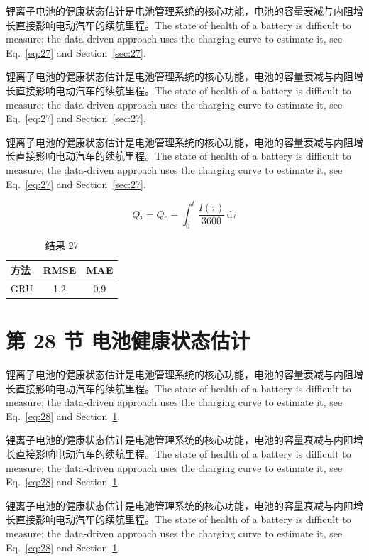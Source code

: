 \documentclass[UTF8,fontset=mac]{ctexart}
\begin{document}
锂离子电池的健康状态估计是电池管理系统的核心功能，电池的容量衰减与内阻增长直接影响电动汽车的续航里程\cite{a2020}。The state of health of a battery is difficult to measure; the data-driven approach uses the charging curve to estimate it, see Eq.~\eqref{eq:27} and Section~\ref{sec:27}.

锂离子电池的健康状态估计是电池管理系统的核心功能，电池的容量衰减与内阻增长直接影响电动汽车的续航里程\cite{a2020}。The state of health of a battery is difficult to measure; the data-driven approach uses the charging curve to estimate it, see Eq.~\eqref{eq:27} and Section~\ref{sec:27}.

锂离子电池的健康状态估计是电池管理系统的核心功能，电池的容量衰减与内阻增长直接影响电动汽车的续航里程\cite{a2020}。The state of health of a battery is difficult to measure; the data-driven approach uses the charging curve to estimate it, see Eq.~\eqref{eq:27} and Section~\ref{sec:27}.

\begin{equation}\label{eq:27}
  Q_t = Q_0 - \int_0^t \frac{I(\tau)}{3600}\,\mathrm{d}\tau
\end{equation}
\begin{table}[h]\centering\begin{tabular}{lcc}\toprule 方法 & RMSE & MAE\\\midrule GRU & 1.2 & 0.9\\\bottomrule\end{tabular}\caption{结果 27}\end{table}

\section{第 28 节 电池健康状态估计}\label{sec:28}
锂离子电池的健康状态估计是电池管理系统的核心功能，电池的容量衰减与内阻增长直接影响电动汽车的续航里程\cite{a2020}。The state of health of a battery is difficult to measure; the data-driven approach uses the charging curve to estimate it, see Eq.~\eqref{eq:28} and Section~\ref{sec:28}.

锂离子电池的健康状态估计是电池管理系统的核心功能，电池的容量衰减与内阻增长直接影响电动汽车的续航里程\cite{a2020}。The state of health of a battery is difficult to measure; the data-driven approach uses the charging curve to estimate it, see Eq.~\eqref{eq:28} and Section~\ref{sec:28}.

锂离子电池的健康状态估计是电池管理系统的核心功能，电池的容量衰减与内阻增长直接影响电动汽车的续航里程\cite{a2020}。The state of health of a battery is difficult to measure; the data-driven approach uses the charging curve to estimate it, see Eq.~\eqref{eq:28} and Section~\ref{sec:28}.
\end{document}
